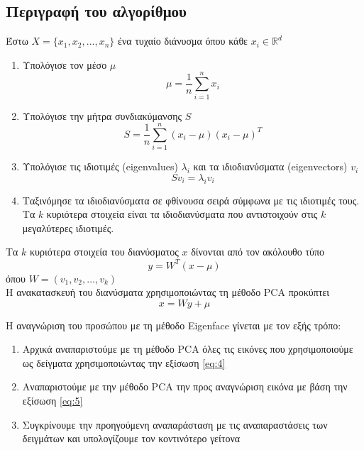\subsection{Περιγραφή του αλγορίθμου}\label{subsec:eigenalgo}

Έστω $X = \{x_1, x_2, ..., x_n\}$ ένα τυχαίο διάνυσμα όπου κάθε $x_i \in \mathbb{R}^d$

\begin{enumerate}
    \item Υπολόγισε τον μέσο $\mu$
        \begin{equation}
            \mu = \frac{1}{n}\sum_{i=1}^{n} x_i
            \tag{1}
        \end{equation}

    \item Υπολόγισε την μήτρα συνδιακύμανσης $S$
        \begin{equation}
            S = \frac{1}{n}\sum_{i=1}^{n} (x_i-\mu)(x_i-\mu)^T
            \tag{2}
        \end{equation}

    \item Υπολόγισε τις ιδιοτιμές (eigenvalues) $ \lambda_i $ και τα ιδιοδιανύσματα (eigenvectors) $ v_i $
        \begin{equation}
            Sv_i = \lambda_i v_i
            \tag{3}
        \end{equation}

    \item Ταξινόμησε τα ιδιοδιανύσματα σε φθίνουσα σειρά σύμφωνα με τις ιδιοτιμές τους. Τα $ k $ κυριότερα στοιχεία
        είναι τα ιδιοδιανύσματα που αντιστοιχούν στις $ k $ μεγαλύτερες ιδιοτιμές.
\end{enumerate}

Τα $ k $ κυριότερα στοιχεία του διανύσματος $ x $ δίνονται από τον ακόλουθο τύπο
\begin{equation}
    y = W^T(x-\mu)
    \tag{4}
    \label{eq:4}
\end{equation}όπου
$ W = (v_1, v_2, \ldots, v_k) $
\\
Η ανακατασκευή του διανύσματα χρησιμοποιώντας τη μέθοδο PCA προκύπτει
\begin{equation}
    x = Wy + \mu
    \tag{5}
    \label{eq:5}
\end{equation}

Η αναγνώριση του προσώπου με τη μέθοδο Eigenface γίνεται με τον εξής τρόπο:
\begin{enumerate}
    \item Αρχικά αναπαριστούμε με τη μέθοδο PCA όλες τις εικόνες που χρησιμοποιούμε ως δείγματα
        χρησιμοποιώντας την εξίσωση \ref{eq:4}
    \item Αναπαριστούμε με την μέθοδο PCA την προς αναγνώριση εικόνα με βάση την εξίσωση \ref{eq:5}
    \item Συγκρίνουμε την προηγούμενη αναπαράσταση με τις αναπαραστάσεις των δειγμάτων και
        υπολογίζουμε τον κοντινότερο γείτονα
\end{enumerate}

